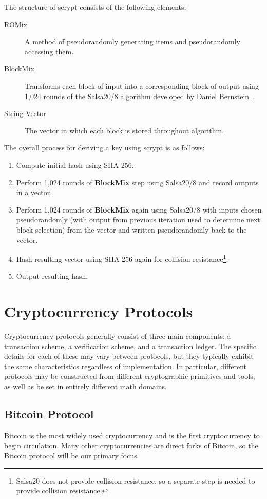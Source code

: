 \documentclass[11pt]{article}
\begin{document}
The structure of scrypt consists of the following elements:
\begin{description}
\item[ROMix] A method of pseudorandomly generating items and pseudorandomly
    accessing them.
\item[BlockMix] Transforms each block of input into a corresponding block of
    output using 1,024 rounds of the {\sc Salsa20/8} algorithm developed by Daniel
    Bernstein~\cite{bernstein08}.
\item[String Vector] The vector in which each block is stored throughout
    algorithm.
\end{description}

The overall process for deriving a key using scrypt is as follows:
\begin{enumerate}
    \item Compute initial hash using {\sc SHA-256}.
    \item Perform 1,024 rounds of \textbf{BlockMix} step using {\sc Salsa20/8}
        and record outputs in a vector.
    \item Perform 1,024 rounds of \textbf{BlockMix} again using {\sc Salsa20/8}
        with inputs chosen pseudorandomly (with output from previous iteration
        used to determine next block selection) from the vector and written
        pseudorandomly back to the vector.
    \item Hash resulting vector using {\sc SHA-256} again for collision
        resistance\footnote{{\sc Salsa20} does not provide collision resistance,
        so a separate step is needed to provide collision resistance.}.
    \item Output resulting hash.
\end{enumerate}

\section{Cryptocurrency Protocols}
Cryptocurrency protocols generally consist of three main components: a
transaction scheme, a verification scheme, and a transaction ledger. The specific
details for each of these may vary between protocols, but they typically exhibit
the same characteristics regardless of implementation. In particular, different
protocols may be constructed from different cryptographic primitives and tools,
as well as be set in entirely different math domains.

\subsection{Bitcoin Protocol}
Bitcoin is the most widely used cryptocurrency and is the first cryptocurrency
to begin circulation. Many other cryptocurrencies are direct forks of Bitcoin,
so the Bitcoin protocol will be our primary focus.
\end{document}
